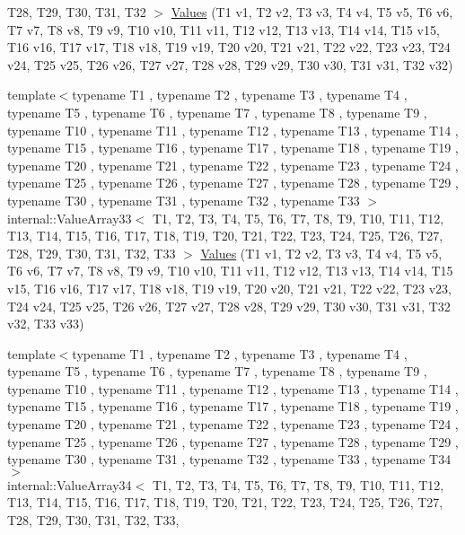 \begin{DoxyCompactItemize}
\-T28, \-T29, \-T30, \-T31, \-T32 $>$ \hyperlink{namespacetesting_afeff614d4c808c753bbfa208409ad664}{\-Values} (\-T1 v1, \-T2 v2, \-T3 v3, \-T4 v4, \-T5 v5, \-T6 v6, \-T7 v7, \-T8 v8, \-T9 v9, \-T10 v10, \-T11 v11, \-T12 v12, \-T13 v13, \-T14 v14, \-T15 v15, \-T16 v16, \-T17 v17, \-T18 v18, \-T19 v19, \-T20 v20, \-T21 v21, \-T22 v22, \-T23 v23, \-T24 v24, \-T25 v25, \-T26 v26, \-T27 v27, \-T28 v28, \-T29 v29, \-T30 v30, \-T31 v31, \-T32 v32)
\item 
{\footnotesize template$<$typename T1 , typename T2 , typename T3 , typename T4 , typename T5 , typename T6 , typename T7 , typename T8 , typename T9 , typename T10 , typename T11 , typename T12 , typename T13 , typename T14 , typename T15 , typename T16 , typename T17 , typename T18 , typename T19 , typename T20 , typename T21 , typename T22 , typename T23 , typename T24 , typename T25 , typename T26 , typename T27 , typename T28 , typename T29 , typename T30 , typename T31 , typename T32 , typename T33 $>$ }\\internal\-::\-Value\-Array33$<$ \-T1, \-T2, \*
\-T3, \-T4, \-T5, \-T6, \-T7, \-T8, \-T9, \*
\-T10, \-T11, \-T12, \-T13, \-T14, \-T15, \*
\-T16, \-T17, \-T18, \-T19, \-T20, \-T21, \*
\-T22, \-T23, \-T24, \-T25, \-T26, \-T27, \*
\-T28, \-T29, \-T30, \-T31, \-T32, \-T33 $>$ \hyperlink{namespacetesting_ac972228f2ff86974ab6591a10512326a}{\-Values} (\-T1 v1, \-T2 v2, \-T3 v3, \-T4 v4, \-T5 v5, \-T6 v6, \-T7 v7, \-T8 v8, \-T9 v9, \-T10 v10, \-T11 v11, \-T12 v12, \-T13 v13, \-T14 v14, \-T15 v15, \-T16 v16, \-T17 v17, \-T18 v18, \-T19 v19, \-T20 v20, \-T21 v21, \-T22 v22, \-T23 v23, \-T24 v24, \-T25 v25, \-T26 v26, \-T27 v27, \-T28 v28, \-T29 v29, \-T30 v30, \-T31 v31, \-T32 v32, \-T33 v33)
\item 
{\footnotesize template$<$typename T1 , typename T2 , typename T3 , typename T4 , typename T5 , typename T6 , typename T7 , typename T8 , typename T9 , typename T10 , typename T11 , typename T12 , typename T13 , typename T14 , typename T15 , typename T16 , typename T17 , typename T18 , typename T19 , typename T20 , typename T21 , typename T22 , typename T23 , typename T24 , typename T25 , typename T26 , typename T27 , typename T28 , typename T29 , typename T30 , typename T31 , typename T32 , typename T33 , typename T34 $>$ }\\internal\-::\-Value\-Array34$<$ \-T1, \-T2, \*
\-T3, \-T4, \-T5, \-T6, \-T7, \-T8, \-T9, \*
\-T10, \-T11, \-T12, \-T13, \-T14, \-T15, \*
\-T16, \-T17, \-T18, \-T19, \-T20, \-T21, \*
\-T22, \-T23, \-T24, \-T25, \-T26, \-T27, \*
\-T28, \-T29, \-T30, \-T31, \-T32, \-T33, \*

\end{DoxyCompactItemize}
